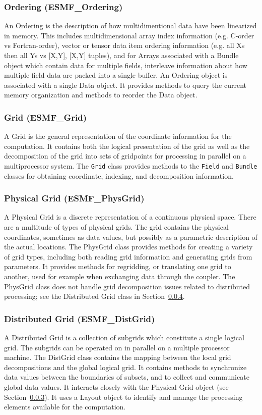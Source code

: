 \subsubsection{Ordering (ESMF\_Ordering)}
\label{sec:ordering} 
An Ordering is the description of how multidimentional data have been
linearized in memory.  This includes multidimensional array index information (e.g. C-order
vs Fortran-order), vector or tensor data item ordering information (e.g. all Xs then all
Ys vs [X,Y], [X,Y] tuples), and for Arrays associated with a Bundle object which contain
data for multiple fields, interleave information about how multiple field data are 
packed into a single buffer.
An Ordering object is associated with a single Data object.  It provides
methods to query the current memory organization and methods to reorder the Data object.

\subsubsection{Grid (ESMF\_Grid)}
\label{sec:grid} 
A Grid is the general representation of the coordinate information for
the computation.  It contains both the logical presentation of the grid 
as well as the
decomposition of the grid into sets of gridpoints for processing in parallel on a
multiprocessor system.  The {\tt Grid} class provides methods to the
{\tt Field} and {\tt Bundle} classes for obtaining coordinate, indexing, and 
decomposition information.

\subsubsection{Physical Grid (ESMF\_PhysGrid)}
\label{sec:physgrid} 
A Physical Grid is a discrete representation of a continuous physical space.
There are a multitude of types of physical grids.
The grid contains the physical coordinates, sometimes as data values, but possibly
as a parametric description of the actual locations.  
The PhysGrid class provides methods for creating a variety of grid 
types, including both reading grid information
and generating grids from parameters.  It provides methods for regridding, or translating
one grid to another, used for example when exchanging data through the coupler.
The PhysGrid class does not handle grid decomposition issues related to 
distributed processing; see the Distributed Grid class in Section~\ref{sec:distgrid}.

\subsubsection{Distributed Grid (ESMF\_DistGrid)} 
\label{sec:distgrid} 
A Distributed Grid is a collection of subgrids which
constitute a single logical grid.  The subgrids can be operated on in
parallel on a multiple processor machine.  The DistGrid class contains the mapping
between the local grid decompositions and the global logical grid. 
It contains methods to 
synchronize data values between the boundaries of subsets, and to
collect and communicate global data values.  It interacts closely with
the Physical Grid object (see Section~\ref{sec:physgrid}).
It uses a Layout object to identify and manage the processing elements 
available for the computation.

